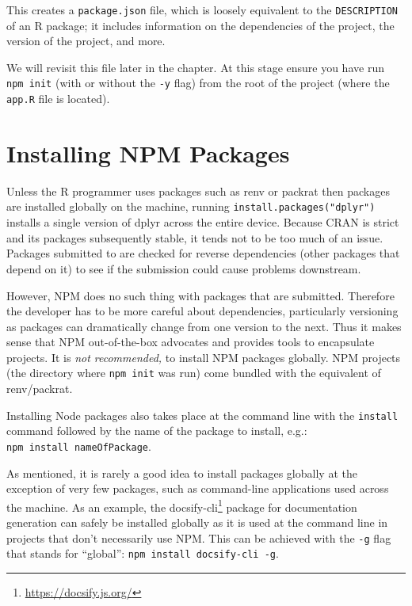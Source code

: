\documentclass[10pt,]{krantz}
\renewcommand{\href}[2]{#2\footnote{\url{#1}}}
\begin{document}
This creates a \texttt{package.json} file, which is loosely equivalent to the \texttt{DESCRIPTION} of an R package; it includes information on the dependencies of the project, the version of the project, and more.

We will revisit this file later in the chapter. At this stage ensure you have run \texttt{npm\ init} (with or without the \texttt{-y} flag) from the root of the project (where the \texttt{app.R} file is located).

\hypertarget{webpack-intro-install-pkgs}{%
\section{Installing NPM Packages}\label{webpack-intro-install-pkgs}}

Unless the R programmer uses packages such as renv \citep{R-renv} or packrat \citep{R-packrat} then packages are installed globally on the machine, running \texttt{install.packages("dplyr")} installs a single version of dplyr across the entire device. Because CRAN is strict and its packages subsequently stable, it tends not to be too much of an issue. Packages submitted to  are checked for reverse dependencies (other packages that depend on it) to see if the submission could cause problems downstream.

However, NPM does no such thing with packages that are submitted. Therefore the developer has to be more careful about dependencies, particularly versioning as packages can dramatically change from one version to the next. Thus it makes sense that NPM out-of-the-box advocates and provides tools to encapsulate projects. It is \emph{not recommended,} to install NPM packages globally. NPM projects (the directory where \texttt{npm\ init} was run) come bundled with the equivalent of renv/packrat.

Installing Node packages also takes place at the command line with the \texttt{install} command followed by the name of the package to install, e.g.: \texttt{npm\ install\ nameOfPackage}.

As mentioned, it is rarely a good idea to install packages globally at the exception of very few packages, such as command-line applications used across the machine. As an example, the \href{https://docsify.js.org/}{docsify-cli} package for documentation generation can safely be installed globally as it is used at the command line in projects that don't necessarily use NPM. This can be achieved with the \texttt{-g} flag that stands for ``global'': \texttt{npm\ install\ docsify-cli\ -g}.
\end{document}

